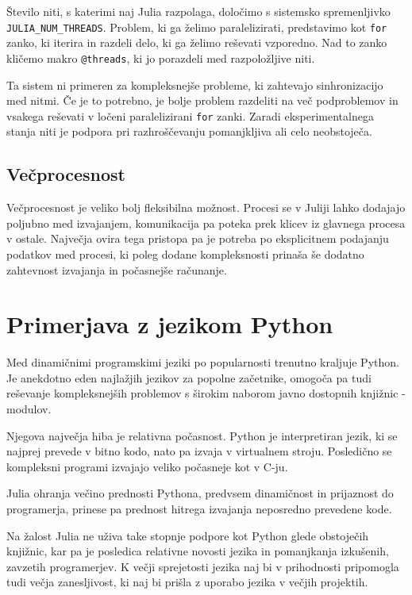 \documentclass[journal,a4paper,twoside]{sty/IEEEtran}
\begin{document}
Število niti, s katerimi naj Julia razpolaga, določimo s sistemsko spremenljivko \texttt{JULIA\_NUM\_THREADS}.
Problem, ki ga želimo paralelizirati, predstavimo kot \texttt{for} zanko, ki iterira in razdeli delo, ki ga želimo reševati vzporedno.
Nad to zanko kličemo makro \texttt{@threads}, ki jo porazdeli med razpoložljive niti.

Ta sistem ni primeren za kompleksnejše probleme, ki zahtevajo sinhronizacijo med nitmi.
Če je to potrebno, je bolje problem razdeliti na več podproblemov in vsakega reševati v ločeni paralelizirani \texttt{for} zanki.
Zaradi eksperimentalnega stanja niti je podpora pri razhroščevanju pomanjkljiva ali celo neobstoječa.\cite{julia-thread-problems}

\subsection{Večprocesnost}

Večprocesnost je veliko bolj fleksibilna možnost.
Procesi se v Juliji lahko dodajajo poljubno med izvajanjem, komunikacija pa poteka prek klicev iz glavnega procesa v ostale.
Največja ovira tega pristopa pa je potreba po eksplicitnem podajanju podatkov med procesi, ki poleg dodane kompleksnosti prinaša še dodatno zahtevnost
	izvajanja in počasnejše računanje.

\section{Primerjava z jezikom Python}

Med dinamičnimi programskimi jeziki po popularnosti trenutno kraljuje Python.\cite{python-tiobe}\cite{python-pypl}
Je anekdotno eden najlažjih jezikov za popolne začetnike, omogoča pa tudi reševanje kompleksnejših problemov s širokim naborom javno dostopnih knjižnic -
	modulov.\cite{python-pypi}

Njegova največja hiba je relativna počasnost.
Python je interpretiran jezik, ki se najprej prevede v bitno kodo, nato pa izvaja v virtualnem stroju.
Posledično se kompleksni programi izvajajo veliko počasneje kot v C-ju.

Julia ohranja večino prednosti Pythona, predvsem dinamičnost in prijaznost do programerja, prinese pa prednost hitrega izvajanja neposredno prevedene
	kode.

Na žalost Julia ne uživa take stopnje podpore kot Python glede obstoječih knjižnic, kar pa je posledica relativne novosti jezika in pomanjkanja izkušenih,
	zavzetih programerjev.
K večji sprejetosti jezika naj bi v prihodnosti pripomogla tudi večja zanesljivost, ki naj bi prišla z uporabo jezika v večjih projektih.
\end{document}
